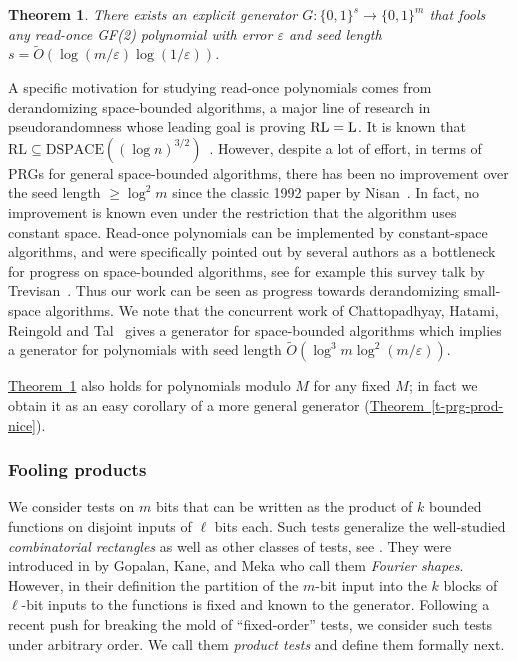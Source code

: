 \documentclass[11pt]{article}
\numberwithin{equation}{section}
\newtheorem{theorem}{Theorem}[section]
\theoremstyle{definition}
\theoremstyle{plain}
\newcommand{\expref}[2]{\hyperref[#2]{#1~\ref{#2}}}
\newcommand{\zo}{\{0,1\}}
\def\eps{\varepsilon}
\def\Blocklength{\ell}
\begin{document}
\begin{theorem} \label{t-prg-poly-intro}
There exists an explicit generator $G\colon \zo^s \to \zo^m$ that fools
any read-once GF(2) polynomial with error $\eps$ and seed length
$s = \tilde O(\log (m/\eps) \log(1/\eps))$.
\end{theorem}
%
%
A specific motivation for studying read-once polynomials comes from derandomizing space-bounded algorithms, 
a major line of research in pseudorandomness whose leading goal is proving $\textnormal{RL}=\textnormal{L}$.
It is known that $\mathrm{RL} \subseteq \mathrm{DSPACE}((\log n)^{3/2})$~\cite{SaksZ99}.
However, 
%
%
%
%
despite a lot of effort, in terms of PRGs for general space-bounded algorithms, there has
been no improvement over the seed length $\ge \log^2 m$ since the classic
1992 paper by Nisan~\cite{Nisan92}.
In fact, no improvement is known even under the restriction that the algorithm
%
uses constant space.   %
Read-once polynomials can be implemented by constant-space algorithms, and were specifically pointed out by several
%
authors   %
as a bottleneck for progress on space-bounded algorithms, see for example this survey talk by Trevisan~\cite{Trevisan10-openproblems}.
Thus our work can be seen as progress towards derandomizing small-space
algorithms.
We note that the concurrent work of Chattopadhyay, Hatami, Reingold and Tal~\cite{ChattopadhyayHRT18} gives a generator for space-bounded algorithms which implies a generator for polynomials with seed length $\tilde O(\log^3 m \log^2(m/\eps))$.

\expref{Theorem}{t-prg-poly-intro} also holds for polynomials modulo $M$ for any fixed $M$; 
in fact we obtain it as an easy corollary of a more general generator
%
(\expref{Theorem}{t-prg-prod-nice}).  %

\subsubsection{Fooling products} %
%
%
We consider tests on $m$ bits that can be written as the product of $k$
bounded functions on disjoint inputs of $\Blocklength$ bits
each.  %
Such tests
generalize the well-studied \emph{combinatorial rectangles}
\cite{AjtaiKS87,Nisan92,NisanZ96,ImpagliazzoNW94,EvenGLNV98,ArmoniSWZ96,Lu02,Viola-rbd,GopalanMRTV12,GopalanY14}
as well as other classes of tests, see \cite{GopalanKM18}. They were
introduced %
in \cite{GopalanKM18}   %
by Gopalan, Kane, and Meka who call them
\emph{Fourier shapes}. However, in their definition the partition of the
$m$-bit input into the $k$ blocks of $\Blocklength$-bit inputs to the functions
is fixed and known
to the generator. Following a recent push for breaking the mold of
``fixed-order'' tests, we consider such tests under arbitrary order. We call
them \emph{product tests} and define them formally next.
\end{document}
